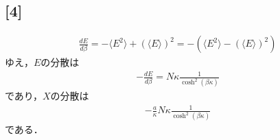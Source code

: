 \documentclass[12pt,dvipdfmx]{jsarticle}
\begin{document}
\subsection*{\large{[4]}}
\begin{eqnarray}
  \frac{dE}{d\beta} = - \langle E^2 \rangle + (\langle E \rangle )^2 = -\left( \langle E^2 \rangle- (\langle E \rangle )^2 \right)
\end{eqnarray}
ゆえ，$E$の分散は
\begin{eqnarray}
  -\frac{dE}{d\beta} = N\kappa \frac{1}{\cosh^2(\beta\kappa)}
\end{eqnarray}
であり，$X$の分散は
\begin{eqnarray}
  -\frac{a}{\kappa}N\kappa \frac{1}{\cosh^2(\beta\kappa)} 
\end{eqnarray}
である．
\end{document}
